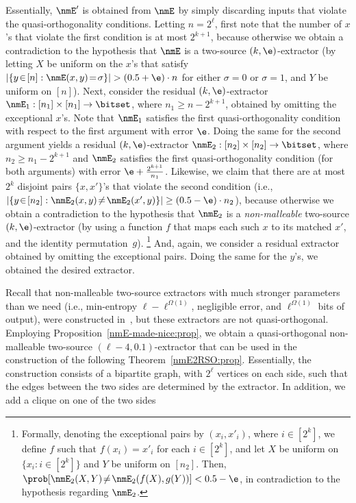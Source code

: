 \BPF
Essentially, $\nmE'$ is obtained from $\nmE$ by simply discarding inputs
that violate the quasi-orthogonality conditions.
%
Letting $n=2^\ell$, first note that the number of $x$'s that violate
the first condition is at most $2^{k+1}$,
because otherwise we obtain a contradiction
to the hypothesis that $\nmE$ is a two-source $(k,\e)$-extractor
(by letting $X$ be uniform on the $x$'s that satisfy
$|\{y\!\in\![n]:\nmE(x,y)\!=\!\sigma\}|>(0.5+\e)\cdot n$
for either $\sigma=0$ or $\sigma=1$, and $Y$ be uniform on $[n]$).
Next, consider the
residual $(k,\e)$-extractor $\nmE_1:[n_1]\times[n_1]\to\bitset$,
where $n_1\geq n-2^{k+1}$, obtained by omitting the exceptional $x$'s.
Note that $\nmE_1$ satisfies the first quasi-orthogonality condition
with respect to the first argument with error $\e$.
Doing the same for the second argument yields
a residual $(k,\e)$-extractor $\nmE_2:[n_2]\times[n_2]\to\bitset$,
where $n_2\geq n_1-2^{k+1}$ and $\nmE_2$ satisfies
the first quasi-orthogonality condition (for both arguments)
with error $\e+\frac{2^{k+1}}{n_1}$.
Likewise, we claim that there are at most $2^{k}$
disjoint pairs $\{x,x'\}$'s that violate the second condition (i.e.,
$|\{y\!\in\![n_2]:\nmE_2(x,y)\!\neq\!\nmE_2(x',y)\}|\geq(0.5-\e)\cdot n_2$),
because otherwise we obtain a contradiction to the hypothesis
that $\nmE_2$ is a {\em non-malleable}\/ two-source $(k,\e)$-extractor
(by using a function $f$ that maps each such $x$ to its matched $x'$,
and the identity permutation~$g$).
\footnote{Formally, denoting the exceptional pairs by $(x_i,x'_i)$,
where $i\in[2^k]$, we define $f$ such that $f(x_i)=x'_i$ for each $i\in[2^k]$,
and let $X$ be uniform on $\{x_i:i\!\in\![2^k]\}$
and $Y$ be uniform on $[n_2]$.
Then, $\prob[\nmE_2(X,Y)\!\neq\!\nmE_2(f(X),g(Y))]<0.5-\e$,
in contradiction to the hypothesis regarding $\nmE_2$.}
%
And, again, we consider a residual extractor obtained
by omitting the exceptional pairs.
Doing the same for the $y$'s, we obtained the desired extractor.
\EPF

\medskip
Recall that non-malleable two-source extractors with much stronger
parameters than we need (i.e., min-entropy $\ell-\ell^{\Omega(1)}$,
negligible error, and $\ell^{\Omega(1)}$ bits of output),
were constructed in~\cite[Thm.~1]{CGL},
but these extractors are not quasi-orthogonal.
Employing Proposition~\ref{nmE-made-nice:prop},
we obtain a quasi-orthogonal non-malleable
two-source $(\ell-4,0.1)$-extractor that can be used
in the construction of the following Theorem~\ref{nmE2RSO:prop}.
%
%
%
%
%
%
Essentially, the construction consists of a bipartite graph,
with $2^\ell$ vertices on each side, such that
the edges between the two sides are determined by the extractor.
In addition, we add a clique on one of the two sides

